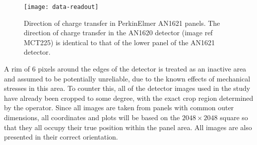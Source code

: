 \documentclass[\main/IO-Pixels.tex]{subfiles}
\begin{document}
\begin{figure}[!ht]
\caption{ Direction of charge transfer in PerkinElmer AN1621 panels\citep{PerkinElmerManual}. The direction of charge transfer in the AN1620 detector (image ref MCT225) is identical to that of the lower panel of the AN1621 detector.}
\label{fig:charge-transfer-direction}
\texttt{[image: data-readout]}
\end{figure} 


A rim of 6 pixels around the edges of the detector is treated as an inactive area and assumed to be potentially unreliable, due to the known effects of mechanical stresses in this area. To counter this, all of the detector images used in the study have already been cropped to some degree, with the exact crop region determined by the operator.  Since all images are taken from panels with common outer dimensions, all coordinates and plots will be based on the $2048 \times 2048$ square so that they all occupy their true position within the panel area. All images are also presented in their correct orientation.
  
\end{document}
